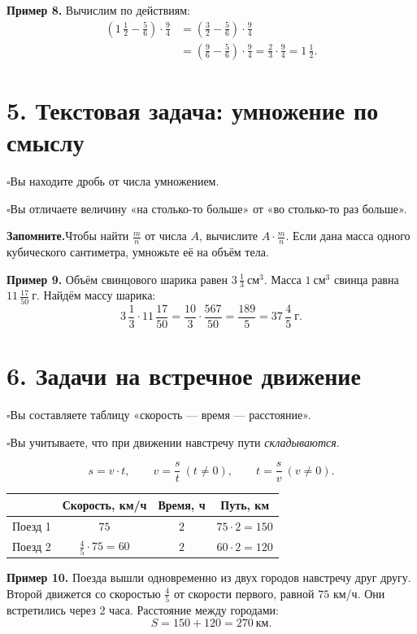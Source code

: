 \documentclass[a4paper,12pt]{article}
\newcommand{\sectionline}[1]{\section*{\color{darkaccent}#1}}
\newcommand{\learn}[1]{\par\noindent$\square$\enspace #1\par}
\newcommand{\keyidea}[1]{\par\noindent\textcolor{darkaccent}{\textbf{Запомните.}}\enspace #1\par}
\newcommand{\mix}[3]{#1\,\frac{#2}{#3}}
\begin{document}
\textbf{Пример 8.} Вычислим по действиям:
\begin{align*}
\left(\mix{1}{1}{2}-\frac56\right)\cdot\frac94
&=\left(\frac32-\frac56\right)\cdot\frac94\\
&=\left(\frac96-\frac56\right)\cdot\frac94
=\frac23\cdot\frac94=\boxed{\mix{1}{1}{2}}.
\end{align*}

\clearpage
\sectionline{5. Текстовая задача: умножение по смыслу}
\learn{Вы находите дробь от числа умножением.}
\learn{Вы отличаете величину «на столько-то больше» от «во столько-то раз больше».}

\keyidea{Чтобы найти $\frac mn$ от числа $A$, вычислите $A\cdot\frac mn$.
Если дана масса одного кубического сантиметра, умножьте её на объём тела.}

\textbf{Пример 9.} Объём свинцового шарика равен $\mix{3}{1}{3}\ \text{см}^3$.
Масса $1\ \text{см}^3$ свинца равна $\mix{11}{17}{50}\ \text{г}$.
Найдём массу шарика:
\[
\mix{3}{1}{3}\cdot\mix{11}{17}{50}
=\frac{10}{3}\cdot\frac{567}{50}
=\frac{189}{5}=\boxed{\mix{37}{4}{5}\ \text{г}}.
\]

\sectionline{6. Задачи на встречное движение}
\learn{Вы составляете таблицу «скорость --- время --- расстояние».}
\learn{Вы учитываете, что при движении навстречу пути \emph{складываются}.}

\[
\boxed{s=v\cdot t},\qquad
v=\frac st\ (t\ne0),\qquad
t=\frac sv\ (v\ne0).
\]

\begin{center}
\begin{tabular}{@{}lccc@{}}
\toprule
& Скорость, км/ч & Время, ч & Путь, км \\
\midrule
Поезд 1 & $75$ & $2$ & $75\cdot2=150$\\
Поезд 2 & $\frac45\cdot75=60$ & $2$ & $60\cdot2=120$\\
\bottomrule
\end{tabular}
\end{center}

\textbf{Пример 10.} Поезда вышли одновременно из двух городов навстречу друг другу.
Второй движется со скоростью $\frac45$ от скорости первого, равной $75$ км/ч.
Они встретились через $2$ часа. Расстояние между городами:
\[
S=150+120=\boxed{270\ \text{км}}.
\]
\begin{center}
\end{center}
\end{document}
